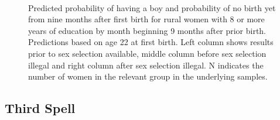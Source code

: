 \documentclass[12pt,letterpaper]{article}
\begin{document}
\begin{figure}[htpb]
{\begin{minipage}{0.31\textwidth}
        \captionsetup[subfigure]{labelformat=empty,position=top,captionskip=-1pt,farskip=-0.5pt}
        \\
        \captionsetup[subfigure]{labelformat=parens}
    \end{minipage}
}
\setcounter{subfigure}{3}
\caption{Predicted probability of having a boy and probability of
no birth yet from nine months after first birth for rural
women with 8 or more years of education by month beginning 9 months after prior birth. 
Predictions based on age 22 at first birth.
Left column shows results prior to sex selection available, middle column before
sex selection illegal and right column after sex selection illegal.
N indicates the number of women in the relevant group in the underlying samples.
}
\label{fig:results_spell2_high_rural}
\end{figure}




\clearpage

\subsection{Third Spell}


\end{document}
